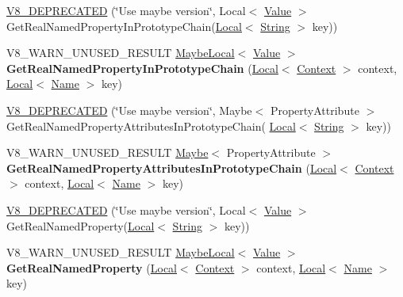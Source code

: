 \begin{DoxyCompactItemize}
\item 
\hyperlink{classv8_1_1Object_a00982b58e0c86fcb37f5d74c8a33d1b8}{V8\+\_\+\+D\+E\+P\+R\+E\+C\+A\+T\+ED} (\char`\"{}Use maybe version\char`\"{}, Local$<$ \hyperlink{classv8_1_1Value}{Value} $>$ Get\+Real\+Named\+Property\+In\+Prototype\+Chain(\hyperlink{classv8_1_1Local}{Local}$<$ \hyperlink{classv8_1_1String}{String} $>$ key))
\item 
V8\+\_\+\+W\+A\+R\+N\+\_\+\+U\+N\+U\+S\+E\+D\+\_\+\+R\+E\+S\+U\+LT \hyperlink{classv8_1_1MaybeLocal}{Maybe\+Local}$<$ \hyperlink{classv8_1_1Value}{Value} $>$ {\bfseries Get\+Real\+Named\+Property\+In\+Prototype\+Chain} (\hyperlink{classv8_1_1Local}{Local}$<$ \hyperlink{classv8_1_1Context}{Context} $>$ context, \hyperlink{classv8_1_1Local}{Local}$<$ \hyperlink{classv8_1_1Name}{Name} $>$ key)\hypertarget{classv8_1_1Object_afe68d490fc41783e30126ca547b7fc90}{}\label{classv8_1_1Object_afe68d490fc41783e30126ca547b7fc90}

\item 
\hyperlink{classv8_1_1Object_ad227cb56752461c88badb0924132cfbc}{V8\+\_\+\+D\+E\+P\+R\+E\+C\+A\+T\+ED} (\char`\"{}Use maybe version\char`\"{}, Maybe$<$ Property\+Attribute $>$ Get\+Real\+Named\+Property\+Attributes\+In\+Prototype\+Chain(                               \hyperlink{classv8_1_1Local}{Local}$<$ \hyperlink{classv8_1_1String}{String} $>$ key))
\item 
V8\+\_\+\+W\+A\+R\+N\+\_\+\+U\+N\+U\+S\+E\+D\+\_\+\+R\+E\+S\+U\+LT \hyperlink{classv8_1_1Maybe}{Maybe}$<$ Property\+Attribute $>$ {\bfseries Get\+Real\+Named\+Property\+Attributes\+In\+Prototype\+Chain} (\hyperlink{classv8_1_1Local}{Local}$<$ \hyperlink{classv8_1_1Context}{Context} $>$ context, \hyperlink{classv8_1_1Local}{Local}$<$ \hyperlink{classv8_1_1Name}{Name} $>$ key)\hypertarget{classv8_1_1Object_aab7c2e5c5659e95e97488e01b04bf3c8}{}\label{classv8_1_1Object_aab7c2e5c5659e95e97488e01b04bf3c8}

\item 
\hyperlink{classv8_1_1Object_a870785c34482a0d284e56db93cd1eb5a}{V8\+\_\+\+D\+E\+P\+R\+E\+C\+A\+T\+ED} (\char`\"{}Use maybe version\char`\"{}, Local$<$ \hyperlink{classv8_1_1Value}{Value} $>$ Get\+Real\+Named\+Property(\hyperlink{classv8_1_1Local}{Local}$<$ \hyperlink{classv8_1_1String}{String} $>$ key))
\item 
V8\+\_\+\+W\+A\+R\+N\+\_\+\+U\+N\+U\+S\+E\+D\+\_\+\+R\+E\+S\+U\+LT \hyperlink{classv8_1_1MaybeLocal}{Maybe\+Local}$<$ \hyperlink{classv8_1_1Value}{Value} $>$ {\bfseries Get\+Real\+Named\+Property} (\hyperlink{classv8_1_1Local}{Local}$<$ \hyperlink{classv8_1_1Context}{Context} $>$ context, \hyperlink{classv8_1_1Local}{Local}$<$ \hyperlink{classv8_1_1Name}{Name} $>$ key)\hypertarget{classv8_1_1Object_aecec39cefb3e394e1696fe618862efec}{}\label{classv8_1_1Object_aecec39cefb3e394e1696fe618862efec}


\end{DoxyCompactItemize}
